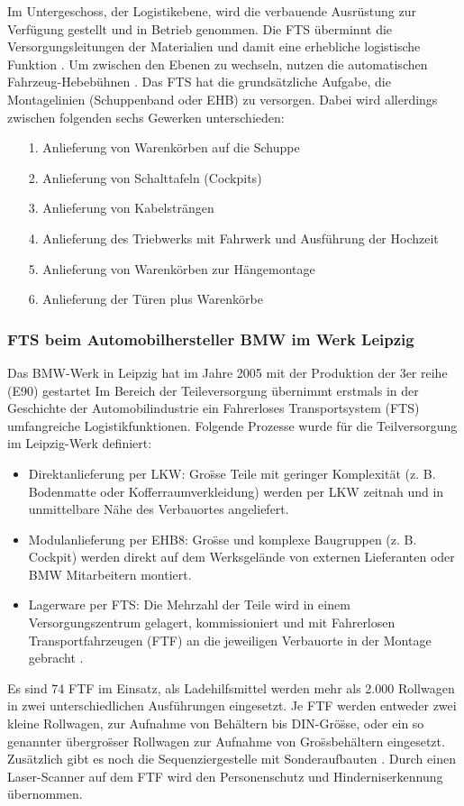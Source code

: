 Im Untergeschoss, der Logistikebene, wird die verbauende Ausr\"ustung zur Verf\"ugung gestellt und in Betrieb genommen. Die FTS \"uberminnt die Versorgungsleitungen der Materialien und damit eine erhebliche logistische Funktion . Um zwischen den Ebenen zu wechseln, nutzen die  automatischen Fahrzeug-Hebeb\"uhnen .
Das FTS hat die grunds\"atzliche Aufgabe, die Montagelinien (Schuppenband oder EHB) zu versorgen. Dabei wird allerdings zwischen folgenden sechs Gewerken unterschieden:
\begin{itemize}
\item[1.] Anlieferung von Warenk\"orben auf die Schuppe
\item[2.] Anlieferung von Schalttafeln (Cockpits)
\item[3.] Anlieferung von Kabelstr\"angen
\item[4.] Anlieferung des Triebwerks mit Fahrwerk und Ausf\"uhrung der Hochzeit
\item[5.] Anlieferung von Warenk\"orben zur H\"angemontage
\item[6.] Anlieferung der T\"uren plus Warenk\"orbe
\end{itemize}
\subsubsection{FTS beim Automobilhersteller BMW im Werk Leipzig}
Das BMW-Werk in Leipzig hat im Jahre 2005 mit der Produktion der 3er reihe (E90) gestartet
Im Bereich der Teileversorgung \"ubernimmt erstmals in der Geschichte der Automobilindustrie ein Fahrerloses Transportsystem (FTS) umfangreiche Logistikfunktionen. Folgende Prozesse wurde f\"ur die Teilversorgung im Leipzig-Werk definiert:

\begin{itemize}
\item Direktanlieferung per LKW: Gro\"sse Teile mit geringer Komplexit\"at (z. B. Bodenmatte oder Kofferraumverkleidung) werden per LKW zeitnah und in unmittelbare N\"ahe des Verbauortes angeliefert.
\item Modulanlieferung per EHB8: Gro\"sse und komplexe Baugruppen (z. B. Cockpit) werden direkt auf dem Werksgel\"ande von externen Lieferanten oder BMW Mitarbeitern montiert.
\item Lagerware per FTS: Die Mehrzahl der Teile wird in einem Versorgungszentrum gelagert, kommissioniert und mit Fahrerlosen Transportfahrzeugen (FTF) an die jeweiligen Verbauorte in der Montage gebracht \cite{Guenther:2011,S.36}.\end{itemize}
Es sind 74 FTF im Einsatz, als Ladehilfsmittel werden mehr als 2.000 Rollwagen in zwei unterschiedlichen Ausf\"uhrungen eingesetzt. Je FTF werden entweder zwei kleine Rollwagen, zur Aufnahme von Beh\"altern bis DIN-Gr\"o\"sse, oder ein so genannter \"ubergro\"sser Rollwagen zur Aufnahme von Gro\"ssbeh\"altern eingesetzt. Zus\"atzlich gibt es noch die Sequenziergestelle mit Sonderaufbauten \cite[S. 37]{Guenther:2011}. Durch einen Laser-Scanner auf dem FTF wird den Personenschutz und Hinderniserkennung \"ubernommen. 

